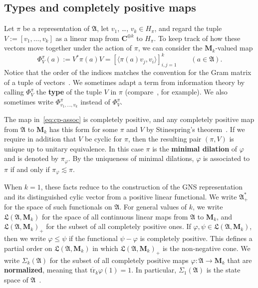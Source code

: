 \documentclass[12pt,a4paper]{article}
\numberwithin{equation}{section}
\theoremstyle{remark}
\newcommand{\bbC}{\mathbf{C}}
\newcommand{\rmM}{\mathbf{M}}
\newcommand{\A}{\mathfrak{A}}
\newcommand{\frL}{\mathfrak{L}}
\renewcommand{\S}{\Sigma}
\renewcommand{\phi}{\varphi}
\newcommand{\tr}{\overline{\mathrm{tr}}}
\begin{document}
\subsection{Types and completely positive maps}\label{subs:types}

Let $\pi$ be a representation of $\A$, let $v_1$, \dots, $v_k \in H_\pi$, and regard the tuple $V := [v_1,\dots,v_k]$ as a linear map from $\bbC^{\oplus k}$ to $H_\pi$.  To keep track of how these vectors move together under the action of $\pi$, we can consider the $\rmM_k$-valued map
\begin{equation}\label{eq:cp-assoc}
\Phi^\pi_V(a) := V^\ast \pi(a) V = [\langle \pi(a)v_j,v_i\rangle]_{i,j=1}^k \qquad (a \in \A).
\end{equation}
Notice that the order of the indices matches the convention for the Gram matrix of a tuple of vectors~\cite[Sec. 7.2]{HorJohMA}.  We sometimes adapt a term from information theory by calling $\Phi^\pi_V$ the \textbf{type} of the tuple $V$ in $\pi$ (compare~\cite[Sec. 11.1]{CovTho06}, for example).  We also sometimes write $\Phi^\pi_{v_1,\dots,v_k}$ instead of $\Phi^\pi_V$.

The map in~\eqref{eq:cp-assoc} is completely positive, and any completely positive map from $\A$ to $\rmM_k$ has this form for some $\pi$ and $V$ by Stinespring's theorem~\cite[Ex. 1.5.2 and Thm. 1.5.3]{BroOza08}.  If we require in addition that $V$ be cyclic for $\pi$, then the resulting pair $(\pi,V)$ is unique up to unitary equivalence.  In this case $\pi$ is the \textbf{minimal dilation} of $\phi$ and is denoted by $\pi_\phi$.  By the uniqueness of minimal dilations, $\phi$ is associated to $\pi$ if and only if $\pi_\phi \lesssim \pi$. %

When $k=1$, these facts reduce to the construction of the GNS representation and its distinguished cylic vector from a positive linear functional.  We write $\A^\ast_+$ for the space of such functionals on $\A$.  For general values of $k$, we write $\frL(\A,\rmM_k)$ for the space of all continuous linear maps from $\A$ to $\rmM_k$, and $\frL(\A,\rmM_k)_+$ for the subset of all completely positive ones.  If $\phi, \psi \in \frL(\A,\rmM_k)$, then we write $\phi \le \psi$ if the functional $\psi - \phi$ is completely positive.  This defines a partial order on $\frL(\A,\rmM_k)$ in which $\frL(\A,\rmM_k)_+$ is the non-negative cone.  We write $\S_k(\A)$ for the subset of all completely positive maps $\phi:\A \to \rmM_k$ that are \textbf{normalized}, meaning that $\tr_k \phi(1) = 1$.  In particular, $\S_1(\A)$ is the state space of $\A$~\cite[Chap. 2]{Dix--Cstar}.
\end{document}
